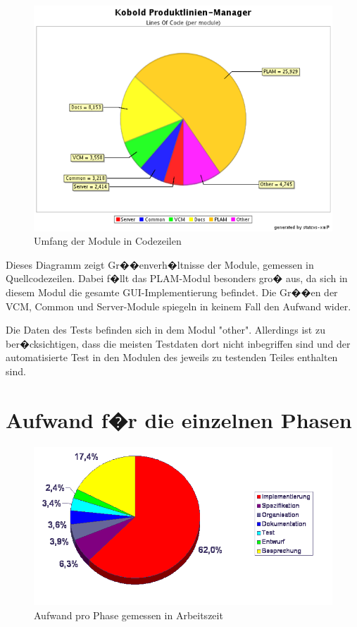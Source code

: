 \documentclass[a4paper,titlepage,12pt,ngerman]{scrbook}
\begin{document}
\begin{figure}[h!]
  \centering
  \includegraphics[width=15cm]{praesentation/modulgroessen}
  \caption{Umfang der Module in Codezeilen}
\end{figure}

Dieses Diagramm zeigt Gr��enverh�ltnisse der Module, gemessen in
Quellcodezeilen. Dabei f�llt das PLAM-Modul besonders gro� aus, da sich
in diesem Modul die gesamte GUI-Implementierung befindet. Die Gr��en der
VCM, Common und Server-Module spiegeln in keinem Fall den Aufwand wider.\par

Die Daten des Tests befinden sich in dem Modul "other". Allerdings ist zu
ber�cksichtigen, dass die meisten Testdaten dort nicht inbegriffen sind und
der automatisierte Test in den Modulen des jeweils zu testenden Teiles enthalten
sind. 


\section{Aufwand f�r die einzelnen Phasen}

\begin{figure}[h!]
  \centering
  \includegraphics[width=15cm]{praesentation/aufwand_pro_phase}
  \caption{Aufwand pro Phase gemessen in Arbeitszeit}
\end{figure}
\end{document}
